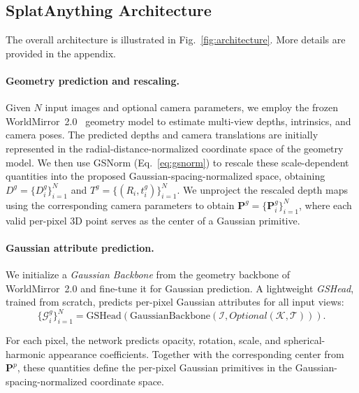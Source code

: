 \subsection{SplatAnything Architecture}
\label{sec:architecture}
The overall architecture is illustrated in
Fig.~\ref{fig:architecture}. More details are provided in the appendix.


\paragraph{Geometry prediction and rescaling.}

Given $N$ input images and optional camera parameters, we employ the
frozen WorldMirror~2.0~\citep{team2026hy} geometry model to estimate
multi-view depths, intrinsics, and camera poses. The predicted depths
and camera translations are initially represented in the
radial-distance-normalized coordinate space of the geometry model.
We then use GSNorm (Eq.~\ref{eq:gsnorm}) to rescale these
scale-dependent quantities into the proposed Gaussian-spacing-normalized
space, obtaining
$D^{g}=\{D_i^{g}\}_{i=1}^{N}$ and
$T^{g}=\{(R_i,t_i^{g})\}_{i=1}^{N}$.
We unproject the rescaled depth maps using the corresponding camera
parameters to obtain
$\mathbf{P}^{g}=\{\mathbf{P}_i^{g}\}_{i=1}^{N}$,
where each valid per-pixel 3D point serves as the center of a Gaussian
primitive.

\paragraph{Gaussian attribute prediction.}

We initialize a \emph{Gaussian Backbone} from the geometry backbone
of WorldMirror~2.0 and fine-tune it for Gaussian prediction.
A lightweight \emph{GSHead}, trained from scratch, predicts
per-pixel Gaussian attributes for all input views:
\begin{equation}
    \{\mathcal{G}_i^{g}\}_{i=1}^{N}
    =
    \mathrm{GSHead}
    \left(
        \mathrm{GaussianBackbone}(\mathcal{I}, Optional\mathcal{(K, T)})
    \right).
\end{equation}

For each pixel, the network predicts opacity, rotation, scale,
and spherical-harmonic appearance coefficients.
Together with the corresponding center from $\mathbf{P}^{p}$,
these quantities define the per-pixel Gaussian primitives in the
Gaussian-spacing-normalized coordinate space.


